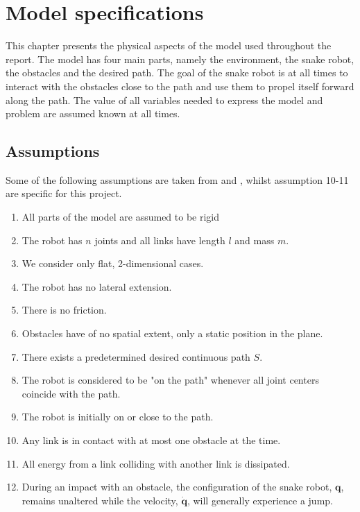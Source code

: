 \chapter{Model specifications} \label{ch:model_specs}

This chapter presents the physical aspects of the model used throughout the report. The model has four main parts, namely the environment, the snake robot, the obstacles and the desired path. The goal of the snake robot is at all times to interact with the obstacles close to the path and use them to propel itself forward along the path. The value of all variables needed to express the model and problem are assumed known at all times.

\section{Assumptions}\label{seq:assumptions}

Some of the following assumptions are taken from \cite{StavdahlNote} and \cite{liljeback2010hybrid}, whilst assumption 10-11 are specific for this project.

\begin{enumerate}
    \item All parts of the model are assumed to be rigid
    \item The robot has $n$ joints and all links have length $l$ and mass $m$.
    \item We consider only flat, 2-dimensional cases.
    \item The robot has no lateral extension.
    \item There is no friction. 
    \item Obstacles have of no spatial extent, only a static position in the plane.
    \item There exists a predetermined desired continuous path $S$.
    \item The robot is considered to be "on the path" whenever all joint centers coincide with the path.
    \item The robot is initially on or close to the path.
    \item Any link is in contact with at most one obstacle at the time.
    \item All energy from a link colliding with another link is dissipated.
    \item During an impact with an obstacle, the configuration of the snake robot, $\mathbf{q}$, remains unaltered while the velocity, $\mathbf{\dot{q}}$, will generally experience a jump.
\end{enumerate}

